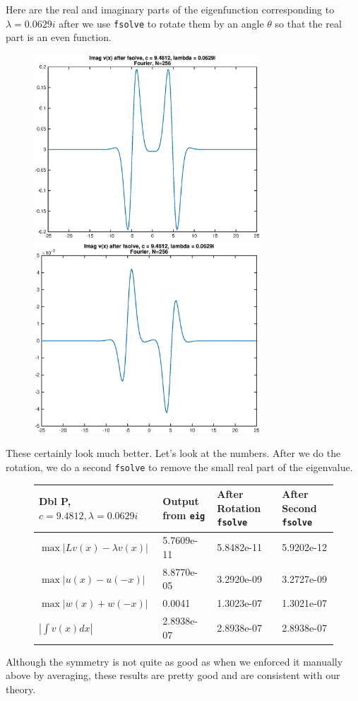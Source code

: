 \documentclass[12pt]{article}
\begin{document}
Here are the real and imaginary parts of the eigenfunction corresponding to $\lambda = 0.0629i$ after we use \texttt{fsolve} to rotate them by an angle $\theta$ so that the real part is an even function.

\begin{figure}[H]
\includegraphics[width=8.5cm]{2eigenfnrealafter.eps}
\includegraphics[width=8.5cm]{2eigenfnimagafter.eps}
\end{figure}

These certainly look much better. Let's look at the numbers. After we do the rotation, we do a second \texttt{fsolve} to remove the small real part of the eigenvalue.

\begin{figure}[H]
\begin{tabular}{l|l|l|l}
 Dbl P, $c = 9.4812, \lambda=0.0629i$  & Output from \texttt{eig} & After Rotation \texttt{fsolve} & After Second \texttt{fsolve}\\\hline
$\max|Lv(x) - \lambda v(x)|$  & 5.7609e-11 & 5.8482e-11 & 5.9202e-12 \\ 
$\max|u(x) - u(-x) |$         & 8.8770e-05 & 3.2920e-09 & 3.2727e-09 \\
$\max|w(x) + w(-x) |$         & 0.0041     & 1.3023e-07 & 1.3021e-07 \\
$|\int v(x) dx|$              & 2.8938e-07 & 2.8938e-07 & 2.8938e-07 \\
\end{tabular}
\end{figure}

Although the symmetry is not quite as good as when we enforced it manually above by averaging, these results are pretty good and are consistent with our theory. 
\end{document}
